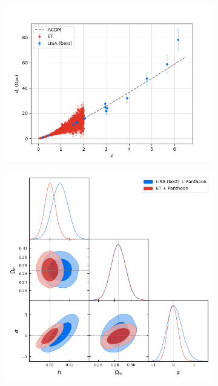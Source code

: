 \begin{figure}[h!]
    \centering
    \begin{subfigure}[b]{0.49\textwidth}
        \centering
        \includegraphics[width=\textwidth]{figures/ET-4,LISA-9.png}
    \end{subfigure}
    \hfill
    \begin{subfigure}[b]{0.49\textwidth}
        \centering
        \includegraphics[width=\textwidth]{figures/fQ-LCDM-bg_ET-4,LISA-9_pantheon-binned.png}

\end{subfigure}
\end{figure}
